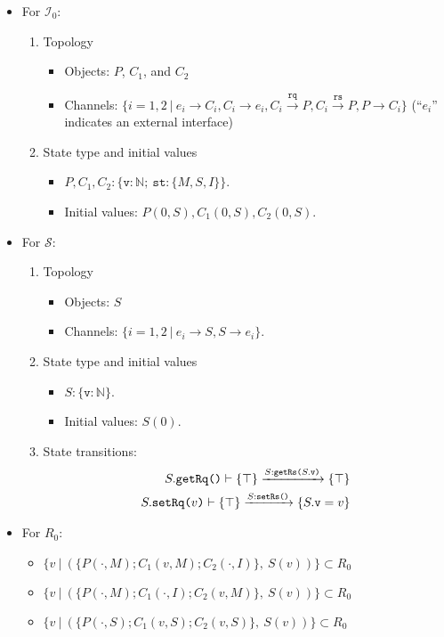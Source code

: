 \documentclass[format=manuscript]{acmart}
\begin{document}
\begin{itemize}
\item For $\mathcal{I}_0$:
  \begin{enumerate}
  \item Topology
    \begin{itemize}
    \item Objects: $P$, $C_1$, and $C_2$
    \item Channels: $\{ i = 1,2\ |\ e_i \rightarrow C_i, C_i \rightarrow e_i,
      C_i \xrightarrow{\texttt{rq}} P, C_i \xrightarrow{\texttt{rs}} P, P
      \rightarrow C_i \}$ (``$e_i$'' indicates an external interface)
    \end{itemize}
  \item State type and initial values
    \begin{itemize}
    \item $P, C_1, C_2: \{ \texttt{v}: \mathbb{N};\ \texttt{st}: \{M, S, I\} \}$.
    \item Initial values: $P(0, S), C_1(0, S), C_2(0, S)$.
    \end{itemize}
  \end{enumerate}
\item For $\mathcal{S}$:
  \begin{enumerate}
  \item Topology
    \begin{itemize}
    \item Objects: $S$
    \item Channels: $\{ i = 1,2\ |\ e_i \rightarrow S, S \rightarrow e_i \}$.
    \end{itemize}
  \item State type and initial values
    \begin{itemize}
    \item $S: \{ \texttt{v}: \mathbb{N} \}$.
    \item Initial values: $S(0)$.
    \end{itemize}
  \item State transitions:
    \begin{eqnarray}
      S.\texttt{getRq()}\vdash \{ \top \} \xrightarrow{S:\texttt{getRs(}S.\texttt{v}\texttt{)}} \{ \top \} \label{trs3} \\
      S.\texttt{setRq(}v\texttt{)}\vdash \{ \top \} \xrightarrow{S:\texttt{setRs()}} \{ S.\texttt{v} = v \} \label{trs4}
    \end{eqnarray}
  \end{enumerate}
\item For $R_0$:
  \begin{itemize}
  \item $\{ v\ |\ (\{ P(\cdot, M); C_1(v, M); C_2(\cdot, I) \},\ S(v)) \} \subset R_0$
  \item $\{ v\ |\ (\{ P(\cdot, M); C_1(\cdot, I); C_2(v, M) \},\ S(v)) \} \subset R_0$
  \item $\{ v\ |\ (\{ P(\cdot, S); C_1(v, S); C_2(v, S) \},\ S(v)) \} \subset R_0$
  \end{itemize}
\end{itemize}
\end{document}
